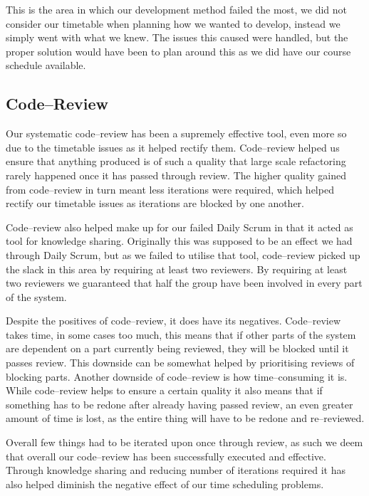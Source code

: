 This is the area in which our development method failed the most, we did not consider our timetable when planning how we wanted to develop, instead we simply went with what we knew.
The issues this caused were handled, but the proper solution would have been to plan around this as we did have our course schedule available.

\subsection{Code--Review}
Our systematic code--review has been a supremely effective tool, even more so due to the timetable issues as it helped rectify them.
Code--review helped us ensure that anything produced is of such a quality that large scale refactoring rarely happened once it has passed through review.
The higher quality gained from code--review in turn meant less iterations were required, which helped rectify our timetable issues as iterations are blocked by one another.

Code--review also helped make up for our failed Daily Scrum in that it acted as tool for knowledge sharing.
Originally this was supposed to be an effect we had through Daily Scrum, but as we failed to utilise that tool, code--review picked up the slack in this area by requiring at least two reviewers.
By requiring at least two reviewers we guaranteed that half the group have been involved in every part of the system.

\bigskip
Despite the positives of code--review, it does have its negatives.
Code--review takes time, in some cases too much, this means that if other parts of the system are dependent on a part currently being reviewed, they will be blocked until it passes review.
This downside can be somewhat helped by prioritising reviews of blocking parts.
Another downside of code--review is how time--consuming it is.
While code--review helps to ensure a certain quality it also means that if something has to be redone after already having passed review, an even greater amount of time is lost, as the entire thing will have to be redone and re--reviewed.

Overall few things had to be iterated upon once through review, as such we deem that overall our code--review has been successfully executed and effective.
Through knowledge sharing and reducing number of iterations required it has also helped diminish the negative effect of our time scheduling problems.
